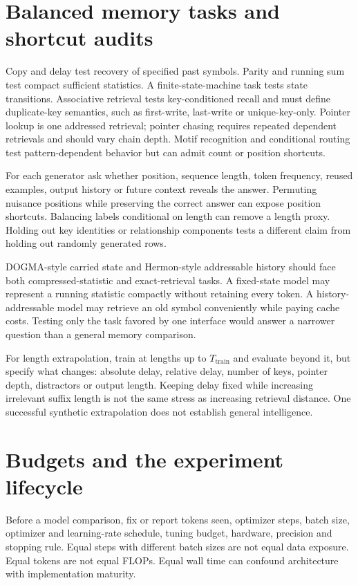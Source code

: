 \section{Balanced memory tasks and shortcut audits}

Copy and delay test recovery of specified past symbols. Parity and running sum test compact sufficient statistics. A finite-state-machine task tests state transitions. Associative retrieval tests key-conditioned recall and must define duplicate-key semantics, such as first-write, last-write or unique-key-only. Pointer lookup is one addressed retrieval; pointer chasing requires repeated dependent retrievals and should vary chain depth. Motif recognition and conditional routing test pattern-dependent behavior but can admit count or position shortcuts.

For each generator ask whether position, sequence length, token frequency, reused examples, output history or future context reveals the answer. Permuting nuisance positions while preserving the correct answer can expose position shortcuts. Balancing labels conditional on length can remove a length proxy. Holding out key identities or relationship components tests a different claim from holding out randomly generated rows.

DOGMA-style carried state and Hermon-style addressable history should face both compressed-statistic and exact-retrieval tasks. A fixed-state model may represent a running statistic compactly without retaining every token. A history-addressable model may retrieve an old symbol conveniently while paying cache costs. Testing only the task favored by one interface would answer a narrower question than a general memory comparison.

For length extrapolation, train at lengths up to $T_{\mathrm{train}}$ and evaluate beyond it, but specify what changes: absolute delay, relative delay, number of keys, pointer depth, distractors or output length. Keeping delay fixed while increasing irrelevant suffix length is not the same stress as increasing retrieval distance. One successful synthetic extrapolation does not establish general intelligence.

\section{Budgets and the experiment lifecycle}
Before a model comparison, fix or report tokens seen, optimizer steps, batch size, optimizer and learning-rate schedule, tuning budget, hardware, precision and stopping rule. Equal steps with different batch sizes are not equal data exposure. Equal tokens are not equal FLOPs. Equal wall time can confound architecture with implementation maturity.

